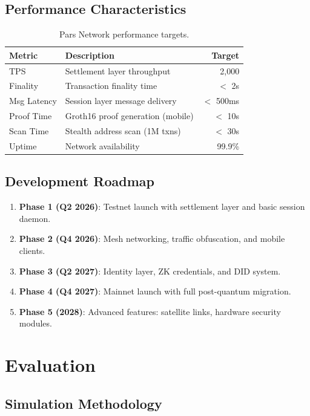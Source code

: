 \documentclass[11pt,a4paper,twocolumn]{article}
\begin{document}
\subsection{Performance Characteristics}

\begin{table}[H]
\centering
\caption{Pars Network performance targets.}
\label{tab:performance}
\begin{tabularx}{\columnwidth}{lXr}
\toprule
\textbf{Metric} & \textbf{Description} & \textbf{Target} \\
\midrule
TPS & Settlement layer throughput & 2,000 \\
Finality & Transaction finality time & $<$ 2s \\
Msg Latency & Session layer message delivery & $<$ 500ms \\
Proof Time & Groth16 proof generation (mobile) & $<$ 10s \\
Scan Time & Stealth address scan (1M txns) & $<$ 30s \\
Uptime & Network availability & 99.9\% \\
\bottomrule
\end{tabularx}
\end{table}

\subsection{Development Roadmap}

\begin{enumerate}[leftmargin=*]
  \item \textbf{Phase 1 (Q2 2026)}: Testnet launch with settlement layer and basic session daemon.
  \item \textbf{Phase 2 (Q4 2026)}: Mesh networking, traffic obfuscation, and mobile clients.
  \item \textbf{Phase 3 (Q2 2027)}: Identity layer, ZK credentials, and DID system.
  \item \textbf{Phase 4 (Q4 2027)}: Mainnet launch with full post-quantum migration.
  \item \textbf{Phase 5 (2028)}: Advanced features: satellite links, hardware security modules.
\end{enumerate}

\section{Evaluation}
\label{sec:evaluation}

\subsection{Simulation Methodology}
\end{document}
